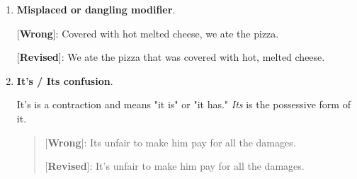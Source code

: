 \begin{enumerate}
 \begin{quote}
[\textbf{Wrong}]: The medication had a side effect it caused severe dry mouth. 

[\textbf{Revised}]: The medication had a side effect; it caused severe dry mouth. 
\end{quote}

\item \textbf{Misplaced or dangling modifier}.

	[\textbf{Wrong}]: Covered with hot melted cheese, we ate the pizza. 
	
	[\textbf{Revised}]: We ate the pizza that was covered with hot, melted cheese. 
	
\item \textbf{It's / Its confusion}.

It's is a contraction and means "it is" or "it has." \emph{Its} is the possessive form of it.

\begin{quote}
[\textbf{Wrong}]: Its unfair to make him pay for all the damages. 

[\textbf{Revised}]: It's unfair to make him pay for all the damages. 
\end{quote}

\end{enumerate}
